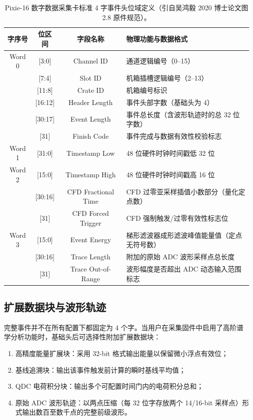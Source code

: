 \begin{table}[!htbp]
\centering\small
\caption{Pixie-16 数字数据采集卡标准 4 字事件头位域定义（引自吴鸿毅 2020 博士论文图 2.8 原件规范）。}\label{tab:appE-header-format}
\begin{tabular*}{\textwidth}{@{\extracolsep{\fill}}cccl@{}}
\toprule
字序号 & 位区间 & 字段名称 & 物理功能与数据格式 \\
\midrule
Word 0 & [3:0] & Channel ID & 通道逻辑编号（0--15） \\
       & [7:4] & Slot ID & 机箱插槽逻辑编号（2--13） \\
       & [11:8] & Crate ID & 机箱编号标识 \\
       & [16:12] & Header Length & 事件头部字数（基础头为 4） \\
       & [30:17] & Event Length & 事件总长度（含波形轨迹时的总 32 位字数） \\
       & [31] & Finish Code & 事件完成与数据有效性校验标志 \\
\midrule
Word 1 & [31:0] & Timestamp Low & 48 位硬件时钟时间戳低 32 位 \\
\midrule
Word 2 & [15:0] & Timestamp High & 48 位硬件时钟时间戳高 16 位 \\
       & [30:16] & CFD Fractional Time & CFD 过零亚采样插值小数部分（量化定点数） \\
       & [31] & CFD Forced Trigger & CFD 强制触发/过零有效性标志位 \\
\midrule
Word 3 & [15:0] & Event Energy & 梯形滤波器成形滤波峰值能量值（定点无符号数） \\
       & [30:16] & Trace Length & 附加的原始 ADC 波形采样点总长度 \\
       & [31] & Trace Out-of-Range & 波形幅度是否超出 ADC 动态输入范围标志 \\
\bottomrule
\end{tabular*}
\end{table}

\subsection{扩展数据块与波形轨迹}

完整事件并不在所有配置下都固定为 4 个字。当用户在采集固件中启用了高阶谱学分析功能时，基础头后可选择性附加扩展数据块：
\begin{enumerate}
\item 高精度能量扩展块：采用 32-bit 格式输出能量以保留微小浮点有效位；
\item 基线追溯块：输出该事件触发前计算的瞬时基线平均值；
\item QDC 电荷积分块：输出多个可配置时间门内的电荷积分总和；
\item 原始 ADC 波形轨迹：以两点压缩（每 32 位字存放两个 14/16-bit 采样点）形式输出数百至数千点的完整前级波形。
\end{enumerate}

